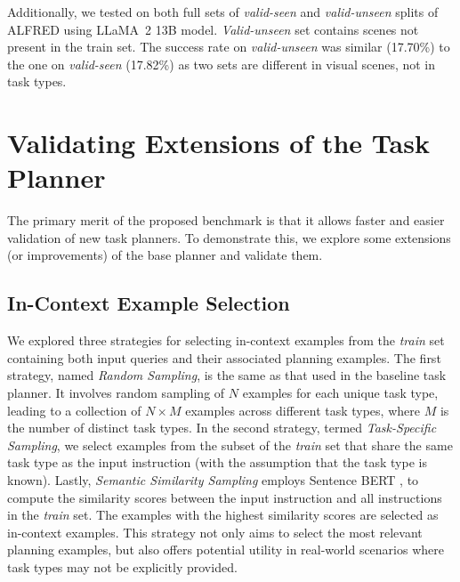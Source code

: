 Additionally, we tested on both full sets of \textit{valid-seen} and \textit{valid-unseen} splits of ALFRED using LLaMA~2 13B model. \textit{Valid-unseen} set contains scenes not present in the train set. The success rate on \textit{valid-unseen} was similar (17.70\%) to the one on \textit{valid-seen} (17.82\%) as two sets are different in visual scenes, not in task types. 

\section{Validating Extensions of the Task Planner}
\label{sec:extension}

The primary merit of the proposed benchmark is that it allows faster and easier validation of new task planners. To demonstrate this, we explore some extensions (or improvements) of the base planner and validate them.

\subsection{In-Context Example Selection}
\label{subsec:in_context_examples_selection}
We explored three strategies for selecting in-context examples from the \textit{train} set containing both input queries and their associated planning examples. The first strategy, named \textit{Random Sampling}, is the same as that used in the baseline task planner. It involves random sampling of $N$ examples for each unique task type, leading to a collection of $N{\times}M$ examples across different task types, where $M$ is the number of distinct task types. In the second strategy, termed \textit{Task-Specific Sampling}, we select examples from the subset of the \textit{train} set that share the same task type as the input instruction (with the assumption that the task type is known). Lastly, \textit{Semantic Similarity Sampling} employs Sentence BERT \citep{reimers2019sentence}, to compute the similarity scores between the input instruction and all instructions in the \textit{train} set. The examples with the highest similarity scores are selected as in-context examples. This strategy not only aims to select the most relevant planning examples, but also offers potential utility in real-world scenarios where task types may not be explicitly provided.

